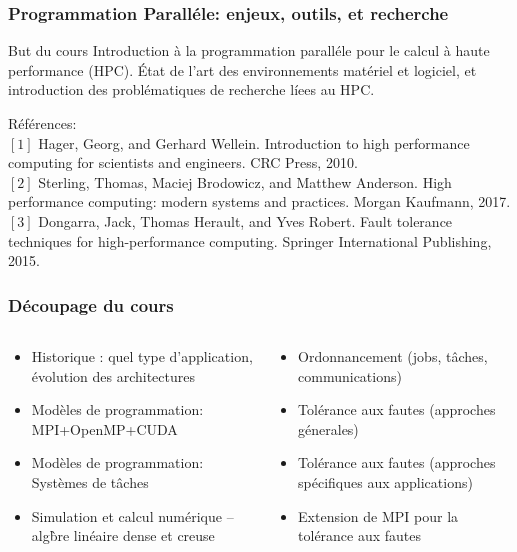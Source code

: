 \documentclass[compress,aspectratio=169]{beamer}
\begin{document}
\begin{frame}
  \frametitle{Programmation Parall\'ele: enjeux, outils, et recherche}

  \begin{beamerboxesrounded}{But du cours}
    Introduction \`a la programmation parall\'ele pour le calcul \`a haute performance (HPC). \'Etat de l'art des environnements mat\'eriel et logiciel, et introduction des probl\'ematiques de recherche l\'iees au HPC.
  \end{beamerboxesrounded}

  \bigskip
  
  \small R\'ef\'erences:\\
  $[1]$ Hager, Georg, and Gerhard Wellein. Introduction to high performance computing for scientists and engineers. CRC Press, 2010.\\
  $[2]$ Sterling, Thomas, Maciej Brodowicz, and Matthew Anderson. High performance computing: modern systems and practices. Morgan Kaufmann, 2017.\\
  $[3]$ Dongarra, Jack, Thomas Herault, and Yves Robert. Fault tolerance techniques for high-performance computing. Springer International Publishing, 2015.
  
\end{frame}

\begin{frame}
  \frametitle{D\'ecoupage du cours}
  \begin{columns}
    \begin{column}{.45\linewidth}
      \begin{itemize}
      \item Historique : quel type d'application, \'evolution des architectures
      \item Mod\`eles de programmation: MPI+OpenMP+CUDA
      \item Mod\`eles de programmation: Syst\`emes de t\^aches
      \item Simulation et calcul num\'erique -- alg\`bre lin\'eaire dense et creuse
      \end{itemize}
    \end{column}\begin{column}{.45\linewidth}
      \begin{itemize}
      \item Ordonnancement (jobs, t\^aches, communications)
      \item Tol\'erance aux fautes (approches g\'enerales)
      \item Tol\'erance aux fautes (approches sp\'ecifiques aux applications)
      \item Extension de MPI pour la tol\'erance aux fautes
      \end{itemize}
    \end{column}
  \end{columns}
\end{frame}
\end{document}
